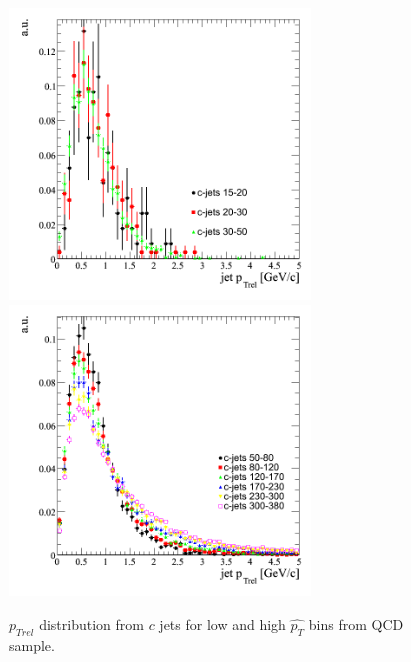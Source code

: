 \begin{figure}[htbp]
  \begin{center}
    \includegraphics[width=80mm]{Figures/jet_ptrelcqcdbinned.png}
    \includegraphics[width=80mm]{Figures/jet_ptrelcqcdbinned2.png}
  \end{center}
  \caption{$p_{Trel}$ distribution from $c$ jets for low and high $\hat{p_T}$ bins from QCD sample.}
  \label{fig:jet_ptrel_c}
\end{figure}


